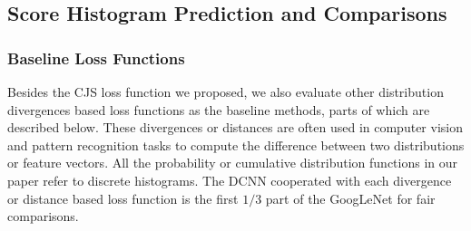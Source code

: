 \documentclass[letterpaper]{article} %
\begin{document}












\subsection{Score Histogram Prediction and Comparisons}
\subsubsection{Baseline Loss Functions}
\label{sec:baseline}
Besides the CJS loss function we proposed, we also evaluate other distribution divergences based loss functions as the baseline methods, parts of which are described below. These divergences or distances are often used in computer vision and pattern recognition tasks to compute the difference between two distributions or feature vectors.  All the probability or cumulative distribution functions in our paper refer to discrete histograms. The DCNN cooperated with each divergence or distance based loss function is the first $1/3$ part of the GoogLeNet  for fair comparisons. 
\end{document}
